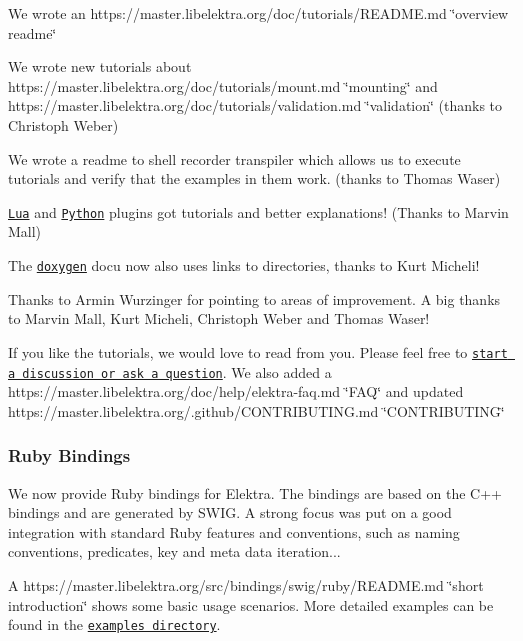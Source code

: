 \begin{DoxyItemize}
\item We wrote an https\+://master.libelektra.\+org/doc/tutorials/\+R\+E\+A\+D\+ME.md \char`\"{}overview readme\char`\"{}
\item We wrote new tutorials about https\+://master.libelektra.\+org/doc/tutorials/mount.md \char`\"{}mounting\char`\"{} and https\+://master.libelektra.\+org/doc/tutorials/validation.md \char`\"{}validation\char`\"{} (thanks to Christoph Weber)
\item We wrote a readme to shell recorder transpiler which allows us to execute tutorials and verify that the examples in them work. (thanks to Thomas Waser)
\item \href{https://master.libelektra.org/src/plugins/lua}{\tt Lua} and \href{https://master.libelektra.org/src/plugins/python}{\tt Python} plugins got tutorials and better explanations! (Thanks to Marvin Mall)
\item The \href{https://doc.libelektra.org/api/0.8.19/html/}{\tt doxygen} docu now also uses links to directories, thanks to Kurt Micheli!
\end{DoxyItemize}

Thanks to Armin Wurzinger for pointing to areas of improvement. A big thanks to Marvin Mall, Kurt Micheli, Christoph Weber and Thomas Waser!

If you like the tutorials, we would love to read from you. Please feel free to \href{https://git.libelektra.org/issues/new}{\tt start a discussion or ask a question}. We also added a https\+://master.libelektra.\+org/doc/help/elektra-\/faq.md \char`\"{}\+F\+A\+Q\char`\"{} and updated https\+://master.libelektra.\+org/.github/\+C\+O\+N\+T\+R\+I\+B\+U\+T\+I\+N\+G.\+md \char`\"{}\+C\+O\+N\+T\+R\+I\+B\+U\+T\+I\+N\+G\char`\"{}

\subsubsection*{Ruby Bindings}

We now provide Ruby bindings for Elektra. The bindings are based on the C++ bindings and are generated by S\+W\+IG. A strong focus was put on a good integration with standard Ruby features and conventions, such as naming conventions, predicates, key and meta data iteration...

A https\+://master.libelektra.\+org/src/bindings/swig/ruby/\+R\+E\+A\+D\+ME.md \char`\"{}short introduction\char`\"{} shows some basic usage scenarios. More detailed examples can be found in the \href{https://master.libelektra.org/src/bindings/swig/ruby/examples}{\tt examples directory}.

